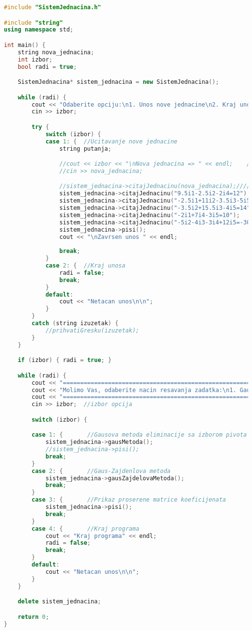 \documentclass[12pt,leqno,a4paper]{article}
\begin{document}
\begin{lstlisting}[language=C++ ]
#include "SistemJednacina.h"

#include "string"
using namespace std;

int main() {
	string nova_jednacina;
	int izbor;
	bool radi = true;

	SistemJednacina* sistem_jednacina = new SistemJednacina();

	while (radi) {
		cout << "Odaberite opciju:\n1. Unos nove jednacine\n2. Kraj unosa " << endl;
		cin >> izbor;

		try {
			switch (izbor) {
			case 1: {  //Ucitavanje nove jednacine
				string putanja;

				//cout << izbor << "\nNova jednacina => " << endl;    //////////////////////////
				//cin >> nova_jednacina;								/////////////////////////

				//sistem_jednacina->citajJednacinu(nova_jednacina);////////////////////////////////////
				sistem_jednacina->citajJednacinu("9.5i1-2.5i2-2i4=12");
				sistem_jednacina->citajJednacinu("-2.5i1+11i2-3.5i3-5i5=-16");
				sistem_jednacina->citajJednacinu("-3.5i2+15.5i3-4i5=14");
				sistem_jednacina->citajJednacinu("-2i1+7i4-3i5=10");
				sistem_jednacina->citajJednacinu("-5i2-4i3-3i4+12i5=-30");
				sistem_jednacina->pisi();
				cout << "\nZavrsen unos " << endl;
				
				break;
			}
			case 2: {  //Kraj unosa
				radi = false;
				break;
			}
			default:
				cout << "Netacan unos\n\n";
			}
		}
		catch (string izuzetak) {
			//prihvatiGresku(izuzetak);
		}
	}

	if (izbor) { radi = true; }

	while (radi) {
		cout << "=======================================================" << endl;
		cout << "Molimo Vas, odaberite nacin resavanja zadatka:\n1. Gausova metoda eliminacije sa izborom pivota\n2. Gaus-Zajdenlova metoda\n3. Prikaz prosirene matrice sistema jednacine\n4. Kraj programa\n " << endl;
		cout << "=======================================================" << endl << endl;
		cin >> izbor;  //izbor opcija

		switch (izbor) {

		case 1: {		//Gausova metoda eliminacije sa izborom pivota
			sistem_jednacina->gausMetoda();
			//sistem_jednacina->pisi();
			break;
		}
		case 2: {		//Gaus-Zajdenlova metoda
			sistem_jednacina->gausZajdelovaMetoda();
			break;
		}	
		case 3: {		//Prikaz proserene matrice koeficijenata
			sistem_jednacina->pisi();
			break;
		}
		case 4: {		//Kraj programa
			cout << "Kraj programa" << endl;
			radi = false;
			break;
		}
		default:
			cout << "Netacan unos\n\n";
		}
	}

	delete sistem_jednacina;

	return 0;
}

\end{lstlisting}
\end{document}
